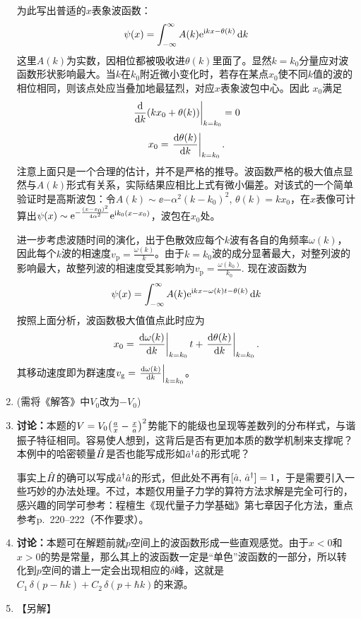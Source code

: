 \begin{enumerate}[label=\textbf{4.\arabic*}, listparindent=\parindent, leftmargin=-0.5mm]
为此写出普适的$x$表象波函数：
\[\psi(x) = \int_{-\infty}^\infty A(k)\mathrm{e}^{\mathrm{i} k x-\theta(k)}\dd{k}\]
这里$A(k)$为实数，因相位都被吸收进$\theta(k)$里面了。显然$k=k_0$分量应对波函数形状影响最大。当$k$在$k_0$附近微小变化时，若存在某点$x_0$使不同$k$值的波的相位相同，则该点处应当叠加地最猛烈，对应$x$表象波包中心。因此
$x_0$满足\[\eval{\dv{k}\qty(k x_0+\theta(k))}_{k=k_0} = 0\]
\[x_0 = \eval{\dv{\theta(k)}{k}}_{k=k_0}.\]
注意上面只是一个合理的估计，并不是严格的推导。波函数严格的极大值点显然与$A(k)$形式有关系，实际结果应相比上式有微小偏差。对该式的一个简单验证时是高斯波包：令$A(k)\sim \ee{-\alpha^2(k-k_0)^2}$, $\theta(k) = kx_0$，在$x$表像可计算出$\psi(x)\sim \mathrm{e}^{-\frac{(x-x_0)^2}{4\alpha^2}}\mathrm{e}^{\mathrm{i} k_0(x-x_0)}$，波包在$x_0$处。

进一步考虑波随时间的演化，出于色散效应每个$k$波有各自的角频率$\omega(k)$，因此每个$k$波的相速度$v_\mathrm{p}=\frac{\omega(k)}{k}$。由于$k=k_0$波的成分显著最大，对整列波的影响最大，故整列波的相速度受其影响为$v_\mathrm{p}=\frac{\omega(k_0)}{k_0}$. 现在波函数为
\[\psi(x) = \int_{-\infty}^\infty A(k)\mathrm{e}^{\mathrm{i} k x-\omega(k)t-\theta(k)}\dd{k}\]
按照上面分析，波函数极大值值点此时应为
\[x_0 =  \eval{\dv{\omega(k)}{k}}_{k=k_0}t +  \eval{\dv{\theta(k)}{k}}_{k=k_0}.\]
其移动速度即为群速度$v_\mathrm{g}=\eval{\dv{\omega(k)}{k}}_{k=k_0}$。

\item
(需将《解答》中$V_0$改为$-V_0$)

\setcounter{enumi}{20}
\item
\noindent\textbf{\color{red}讨论：}本题的$V =V_0\qty(\frac{a}{x}-\frac{x}{a})^2 $势能下的能级也呈现等差数列的分布样式，与谐振子特征相同。容易使人想到，这背后是否有更加本质的数学机制来支撑呢？本例中的哈密顿量$\hat{H}$是否也能写成形如${\hat{a}}^\dagger{\hat{a}}$的形式呢？

事实上$\hat{H}$的确可以写成${\hat{a}}^\dagger{\hat{a}}$的形式，但此处不再有$[{\hat{a}},\,{\hat{a}}^\dagger]=1$，于是需要引入一些巧妙的办法处理。不过，本题仅用量子力学的算符方法求解是完全可行的，感兴趣的同学可参考：程檀生《现代量子力学基础》第七章\;因子化方法，重点参考p.~220--222（不作要求）。

\setcounter{enumi}{22}
\item
\noindent\textbf{\color{red}讨论：}本题可在解题前就$p$空间上的波函数形成一些直观感觉。由于$x<0$和$x>0$的势是常量，那么其上的波函数一定是“单色”波函数的一部分，所以转化到$p$空间的谱上一定会出现相应的$\delta$峰，这就是$C_1\,\delta(p-\hbar k)+C_2\,\delta(p+\hbar k)$的来源。


\setcounter{enumi}{25}
\item 【另解】


\end{enumerate}
